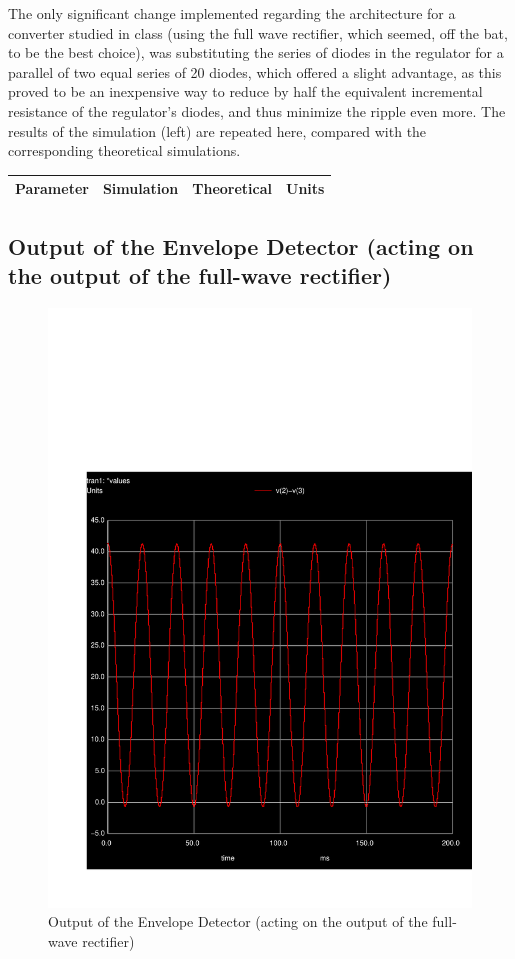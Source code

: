 The only significant change implemented regarding the architecture for a converter studied in class (using the full wave rectifier, which seemed, off the bat, to be the best choice), was substituting the series of diodes in the regulator for a parallel of two equal series of 20 diodes, which offered a slight advantage, as this proved to be an inexpensive way to reduce by half the equivalent incremental resistance of the regulator's diodes, and thus minimize the ripple even more. The results of the simulation (left) are repeated here, compared with the corresponding theoretical simulations.
 
\hfill
 \parbox{1\linewidth}{
  \centering
  \begin{tabular}{|l|l|l|r|}
    {\bf Parameter} & {\bf Simulation} & {\bf Theoretical } & {\bf Units }\\ \hline
    
  \end{tabular}
  \label{tab:results}
  }


  
\subsection{Output of the Envelope Detector (acting on the output of the full-wave rectifier)}

\par
\begin{figure}[H] \centering
\includegraphics[width=0.6\linewidth]{vrect.pdf}
\caption{Output of the Envelope Detector (acting on the output of the full-wave rectifier)}
\label{fig:env}
\end{figure}

